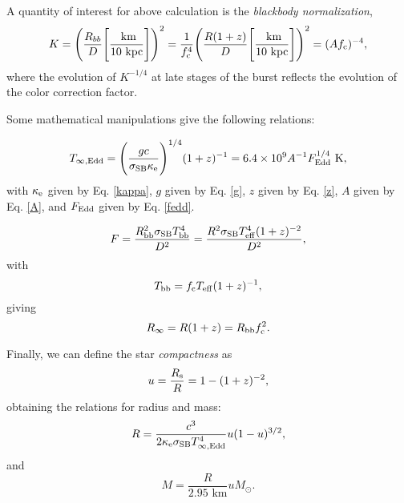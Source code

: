 {\quad

A quantity of interest for above calculation is the {\it blackbody normalization},
\begin{equation}
K = \Bigg ( \frac{R_{bb}}{D} \Bigg[\frac{\mbox{ km}}{10\mbox{ kpc}}\Bigg]  \Bigg)^2 = \frac{1}{f_{\rm c}^4} \Bigg(\frac{R (1+z)}{D}   \Bigg[\frac{\mbox{ km}}{10\mbox{ kpc}}\Bigg]    \Bigg)^2 = (Af_{\rm c})^{-4},
\label{K}
\end{equation}
where the evolution of $K^{-1/4}$ at late stages of the burst reflects the evolution of the color correction factor. 



\quad

Some mathematical manipulations give the following relations:

\begin{equation*}
T_{\infty, \rm Edd} = \Bigg(\frac{gc}{\sigma_{\rm SB} \kappa_{\rm e}} \Bigg)^{1/4} (1+z)^{-1} = 6.4\times 10^9 A^{-1} F_{\rm Edd}^{1/4} \mbox{ K},
\end{equation*}
with $\kappa_{\rm e}$ given by Eq. \ref{kappa}, $g$ given by Eq. \ref{g}, $z$ given by Eq. \ref{z}, $A$ given by Eq. \ref{A}, and $F_{\rm Edd}$ given by Eq. \ref{fedd}.

\begin{equation*}
F=\frac{R_{\rm bb}^2 \sigma_{\rm SB}T^4_{\rm bb}}{D^2} = \frac{ R^2\sigma_{\rm SB}T^4_{\rm eff} (1+z)^{-2}}{D^2},
\end{equation*}
 with
\begin{equation*}
T_{\rm bb} = f_{\rm c} T_{\rm eff} (1+z)^{-1},
\end{equation*}
giving
 \begin{equation*}
R_{\rm \infty} = R(1+z) = R_{\rm bb} f_{\rm c}^2.
\end{equation*}



\quad


Finally, we can define the star {\it compactness} as
\begin{equation*}
u = \frac{R_{\rm s}}{R} = 1 - (1+z)^{-2},
\end{equation*}
obtaining the relations for radius and mass:
\begin{equation*}
R = \frac{c^3}{2\kappa_{\rm e} \sigma_{\rm SB} T^4_{\infty, \rm Edd}} u (1-u)^{3/2},
\end{equation*}
and
\begin{equation*}
M = \frac{R}{2.95 \mbox{ km}}u M_{\odot}.
\end{equation*}


}
